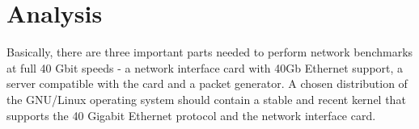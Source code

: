 
\chapter{Analysis}\label{chap:analysis}
Basically, there are three important parts needed to perform network benchmarks at full 40 Gbit speeds -
a network interface card with 40Gb Ethernet support, a server compatible with the card and a packet generator.
A chosen distribution of the GNU/Linux operating system should contain a stable and
recent kernel that supports the 40 Gigabit Ethernet protocol and the network interface card.









